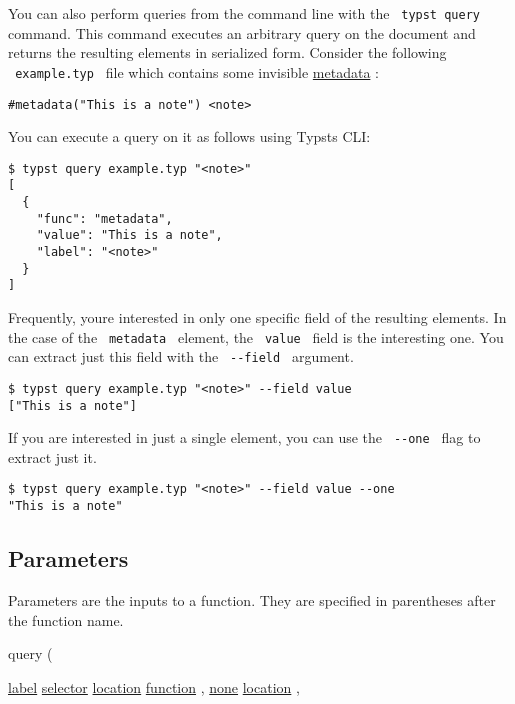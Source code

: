 You can also perform queries from the command line with the
\texttt{\ typst\ query\ } command. This command executes an arbitrary
query on the document and returns the resulting elements in serialized
form. Consider the following \texttt{\ example.typ\ } file which
contains some invisible
\href{/docs/reference/introspection/metadata/}{metadata} :

\begin{verbatim}
#metadata("This is a note") <note>
\end{verbatim}

You can execute a query on it as follows using Typst\textquotesingle s
CLI:

\begin{verbatim}
$ typst query example.typ "<note>"
[
  {
    "func": "metadata",
    "value": "This is a note",
    "label": "<note>"
  }
]
\end{verbatim}

Frequently, you\textquotesingle re interested in only one specific field
of the resulting elements. In the case of the \texttt{\ metadata\ }
element, the \texttt{\ value\ } field is the interesting one. You can
extract just this field with the \texttt{\ -\/-field\ } argument.

\begin{verbatim}
$ typst query example.typ "<note>" --field value
["This is a note"]
\end{verbatim}

If you are interested in just a single element, you can use the
\texttt{\ -\/-one\ } flag to extract just it.

\begin{verbatim}
$ typst query example.typ "<note>" --field value --one
"This is a note"
\end{verbatim}

\subsection{\texorpdfstring{{ Parameters
}}{ Parameters }}\label{parameters}

\label{parameters-tooltip}
Parameters are the inputs to a function. They are specified in
parentheses after the function name.

{ query } (

{ \href{/docs/reference/foundations/label/}{label}
\href{/docs/reference/foundations/selector/}{selector}
\href{/docs/reference/introspection/location/}{location}
\href{/docs/reference/foundations/function/}{function} , } {
\href{/docs/reference/foundations/none/}{none}
\href{/docs/reference/introspection/location/}{location} , }

